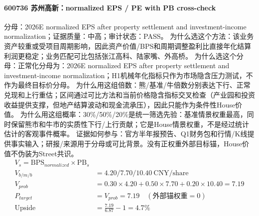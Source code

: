 \paragraph{600736 苏州高新：normalized EPS / PE with PB cross-check}
分母：2026E normalized EPS after property settlement and investment-income normalization；证据质量：中高；审计状态：PASS。
为什么选这个方法：该业务资产较重或受项目周期影响，因此资产价值/BPS和周期调整盈利比直接年化结算利润更稳定；业务匹配可比包括张江高科、陆家嘴、外高桥。
为什么选这个分母：正常化分母为：2026E normalized EPS after property settlement and investment-income normalization；H1机械年化指标只作为市场隐含压力测试，不作为最终目标价分母。
为什么用这组倍数：熊/基准/牛倍数分别表达下行、正常兑现和上行重估；区间通过可比方法和当前价格隐含指标交叉检查（产业园和投资收益提供支撑，但地产结算波动和现金流承压），因此只能作为条件性House价值。
为什么用这组概率：30\%/50\%/20\%是统一筛选先验：基准情景权重最高，同时保留熊市和牛市的实质性下行/上行贡献；它是House情景权重，不是经过统计估计的客观事件概率。
证据如何参与：官方半年报预告、Q1财务包和行情/K线提供事实输入；研报/来源用于分母或可比背景。没有正权重外部目标锚，House价值不伪装为Street共识。
\begin{align*}
V_s=\mathrm{BPS}_{normalized}\times \mathrm{PB}_s\\
V_{b/m/b} &= 4.20/7.70/10.40\ \mathrm{CNY/share}\\
V_{prob} &= 0.30\times 4.20+0.50\times 7.70+0.20\times 10.40=7.19\\
P_{target} &= V_{prob}=7.19\quad(\text{外部锚权重}=0)\\
\mathrm{Upside} &= \frac{7.19}{6.87}-1=4.7\%\\
\end{align*}

